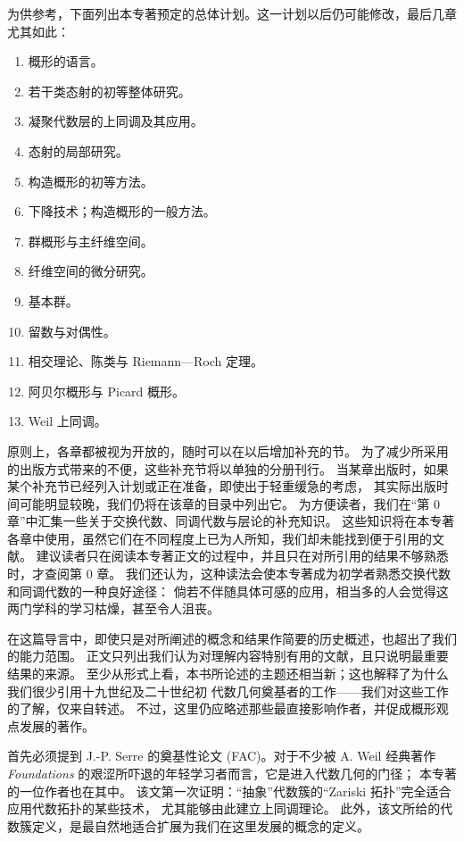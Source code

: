为供参考，下面列出本专著预定的总体计划。这一计划以后仍可能修改，最后几章尤其如此：
\begin{enumerate}[label=第\Roman*章,align=left,leftmargin=5.3em,labelwidth=4.8em]
\item 概形的语言。
\item 若干类态射的初等整体研究。
\item 凝聚代数层的上同调及其应用。
\item 态射的局部研究。
\item 构造概形的初等方法。
\item 下降技术；构造概形的一般方法。
\item 群概形与主纤维空间。
\item 纤维空间的微分研究。
\item 基本群。
\item 留数与对偶性。
\item 相交理论、陈类与 Riemann—Roch 定理。
\item 阿贝尔概形与 Picard 概形。
\item Weil 上同调。
\end{enumerate}

原则上，各章都被视为开放的，随时可以在以后增加补充的节。
为了减少所采用的出版方式带来的不便，这些补充节将以单独的分册刊行。
当某章出版时，如果某个补充节已经列入计划或正在准备，即使出于轻重缓急的考虑，
其实际出版时间可能明显较晚，我们仍将在该章的目录中列出它。
为方便读者，我们在“第 0 章”中汇集一些关于交换代数、同调代数与层论的补充知识。
这些知识将在本专著各章中使用，虽然它们在不同程度上已为人所知，我们却未能找到便于引用的文献。
建议读者只在阅读本专著正文的过程中，并且只在对所引用的结果不够熟悉时，才查阅第 0 章。
我们还认为，这种读法会使本专著成为初学者熟悉交换代数和同调代数的一种良好途径：
倘若不伴随具体可感的应用，相当多的人会觉得这两门学科的学习枯燥，甚至令人沮丧。

\separation

在这篇导言中，即使只是对所阐述的概念和结果作简要的历史概述，也超出了我们的能力范围。
正文只列出我们认为对理解内容特别有用的文献，且只说明最重要结果的来源。
至少从形式上看，本书所论述的主题还相当新；这也解释了为什么我们很少引用十九世纪及二十世纪初
代数几何奠基者的工作——我们对这些工作的了解，仅来自转述。
不过，这里仍应略述那些最直接影响作者，并促成概形观点发展的著作。

首先必须提到 J.-P. Serre 的奠基性论文 (FAC)。对于不少被 A. Weil 经典著作
\textit{Foundations}\cite{b18} 的艰涩所吓退的年轻学习者而言，它是进入代数几何的门径；
本专著的一位作者也在其中。
该文第一次证明：“抽象”代数簇的“Zariski 拓扑”完全适合应用代数拓扑的某些技术，
尤其能够由此建立上同调理论。
此外，该文所给的代数簇定义，是最自然地适合扩展为我们在这里发展的概念的定义。

